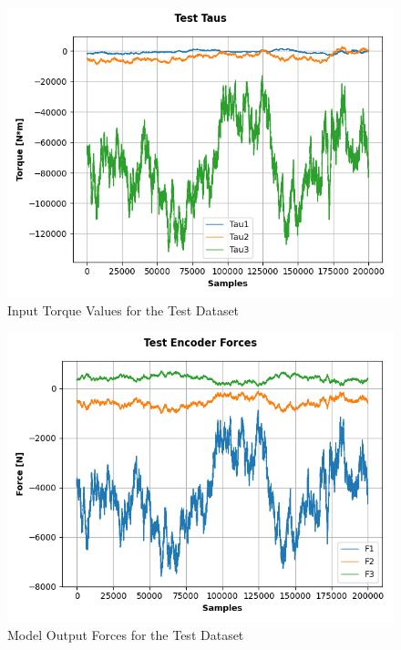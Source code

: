 \documentclass{article}
\begin{document}
\begin{figure}[H]
    \centering
    \includegraphics[scale=0.65]{../best_outputs/tau_fig.png}
    \caption{Input Torque Values for the Test Dataset}
    \label{fig:tau}
\end{figure}

\begin{figure}[H]
    \centering
    \includegraphics[scale=0.65]{../best_outputs/forces_fig.png}
    \caption{Model Output Forces for the Test Dataset}
    \label{fig:forces}
\end{figure}
\end{document}
